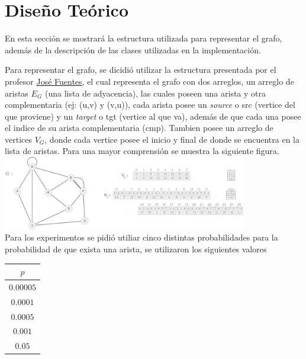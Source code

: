 \documentclass[letterpaper,10pt]{article}
\begin{document}
	

	

	\newpage

	\section{Diseño Teórico}
    
    En esta sección se mostrará la estructura utilizada para representar el grafo, además de la descripción de las clases utilizadas en la implementación.
	
	Para representar el grafo, se dicidió utilizar la estructura presentada por el profesor \href{https://users.dcc.uchile.cl/~jfuentess/}{José Fuentes}, el cual representa el grafo con dos arreglos, un arreglo de aristas $E_G$ (una lista de adyacencia), las cuales poseen una arista y otra complementaria (ej: (u,v) y (v,u)), cada arista posee un \textit{source} o src (vertice del que proviene) y un \textit{target} o tgt (vertice al que va), además de que cada una posee el indice de su arista complementaria (cmp). Tambien posee un arreglo de vertices $V_G$, donde cada vertice posee el inicio y final de donde se encuentra en la lista de aristas. Para una mayor comprensión se muestra la siguiente figura.\\
	
	
		\includegraphics[width=0.8\textwidth]{figura1.png}
	\\
	
	Para los experimentos se pidió utiliar cinco distintas probabilidades para la probabilidad de que exista una arista, se utilizaron los siguientes valores 
	

  \begin{center}
		\begin{tabular}{|c|}
			\hline
			$p$\\
			\hline
			$0.00005$ \\
			\hline
			$0.0001$\\
			\hline
			$0.0005$\\
			\hline
			$0.001$\\
			\hline
			$0.05$\\
			\hline
			
		\end{tabular}
	\end{center}
	
\end{document}
